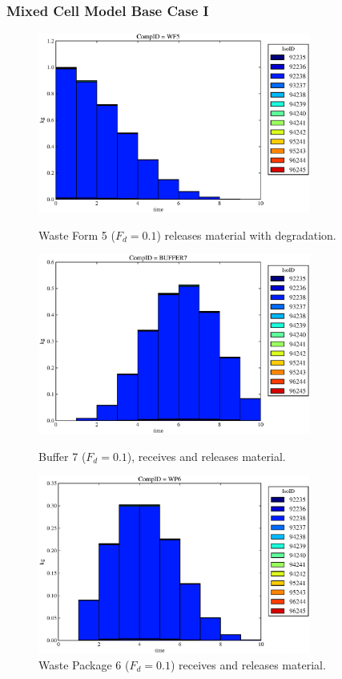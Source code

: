 \begin{frame}[ctb!]
  \frametitle{Mixed Cell Model Base Case I}
  \begin{figure}[htbp!]
\begin{minipage}[b]{0.45\linewidth}

  \includegraphics[width=0.8\textwidth]{./images/mcI1.eps}
  \caption[MCI Waste Form Contaminants.]{
    Waste Form 5 ($F_d = 0.1$) releases material with degradation. 
    }
  \label{fig:mcIwf5}
  
  \includegraphics[width=0.8\textwidth]{./images/mcI3.eps}
  \caption[Case MCI Buffer Contaminants]{
    Buffer 7 ($F_d=0.1$), receives and releases material.
    }
  \label{fig:mcIbuff}

\end{minipage}
\hspace{0.05\linewidth}
\begin{minipage}[b]{0.45\linewidth}
  \includegraphics[width=0.8\textwidth]{./images/mcI2.eps}
  \caption[Case MCI Waste Package Contaminants.]{ 
    Waste Package 6 ($F_d = 0.1$) receives and releases material.
    }
  \label{fig:mcIwp6}


\end{minipage}
\end{figure}
\end{frame}
